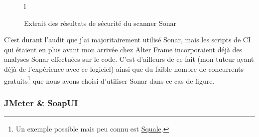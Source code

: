 \begin{figure}{l}
    \caption{Extrait des résultats de sécurité du scanner Sonar}
    \label{fig:sonar_sec}
\end{figure}

C'est durant l'audit que j'ai majoritairement utilisé Sonar, mais les scripts de CI qui étaient en plus avant mon arrivée chez Alter Frame incorporaient déjà des analyses Sonar effectuées sur le code. C'est d'ailleurs de ce fait (mon tuteur ayant déjà de l'expérience avec ce logiciel) ainsi que du faible nombre de concurrents gratuits\footnote{Un exemple possible mais peu connu est \href{http://www.squale.org/}{Squale}.} que nous avons choisi d'utiliser Sonar dans ce cas de figure. 

\subsubsection{JMeter \& SoapUI}
